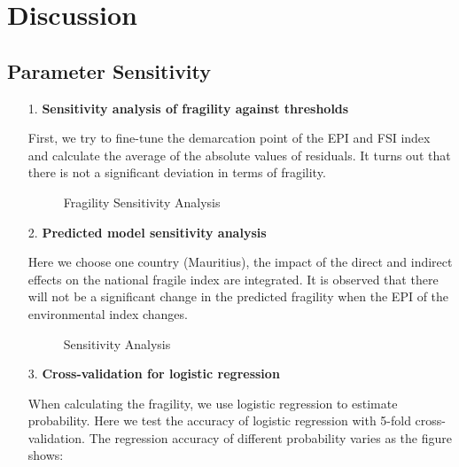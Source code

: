 \section{Discussion}
\label{sec:disc}
\subsection{Parameter Sensitivity}

\begin{itemize}
   \item[1.] \textbf{Sensitivity analysis of fragility against thresholds}

First, we try to fine-tune the demarcation point of the EPI and FSI index and calculate the average of the absolute values of residuals. It turns out that there is not a significant deviation in terms of fragility.
\begin{figure}[htbp]
    \centering
    \caption{Fragility Sensitivity Analysis}
    \label{fig:exp:future}
\end{figure}
   \item[2.] \textbf{Predicted model sensitivity analysis}

Here we choose one country (Mauritius), the impact of the direct and indirect effects on the national fragile index are integrated. It is observed that there will not be a significant change in the predicted fragility when the EPI of the environmental index changes.
\begin{figure}[htbp]
    \centering
    \caption{Sensitivity Analysis}
    \label{fig:exp:future}
\end{figure}
   
   \item[3.] \textbf{Cross-validation for logistic regression}

When calculating the fragility, we use logistic regression to estimate probability. Here we test the accuracy of logistic regression with 5-fold cross-validation. The regression accuracy of different probability varies as the figure shows:
\end{itemize}

